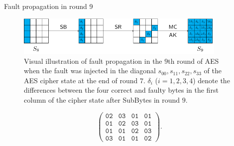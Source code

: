 \begin{frame}{Fault propagation in round 9}
    \begin{figure}
    \centering
    \includegraphics[width=0.9\textwidth]{fig/AES_Fault_Diagnol_Attack_Round_9.pdf}
    \caption{Visual illustration of fault propagation in the $9$th round of AES when the fault was injected in the diagonal $s_{00},s_{11},s_{22},s_{33}$ of the AES cipher state at the end of round $7$.
    $\delta_i$ ($i=1,2,3,4$) denote the differences between the four correct and faulty bytes in the first column of the cipher state after SubBytes in round $9$.}
\end{figure}
\[
\begin{pmatrix}
    \texttt{02} & \texttt{03} & \texttt{01} & \texttt{01} \\
    \texttt{01} & \texttt{02} & \texttt{03} & \texttt{01} \\
    \texttt{01} & \texttt{01} & \texttt{02} & \texttt{03} \\
    \texttt{03} & \texttt{01} & \texttt{01} & \texttt{02}
    \end{pmatrix}.
\]
\end{frame}

